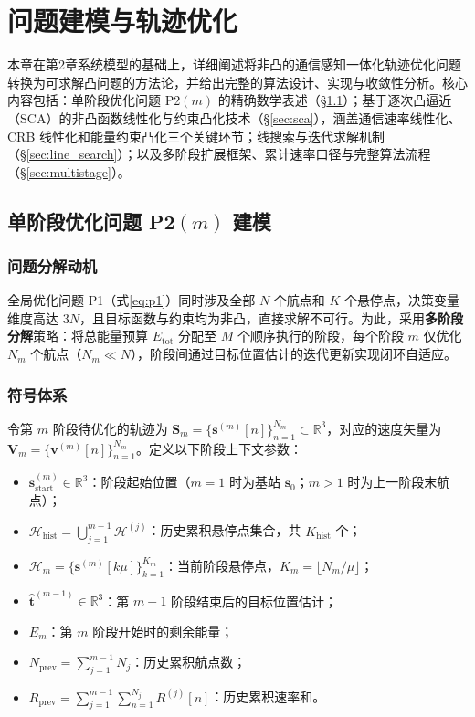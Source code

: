 \chapter{问题建模与轨迹优化}

本章在第2章系统模型的基础上，详细阐述将非凸的通信感知一体化轨迹优化问题转换为可求解凸问题的方法论，并给出完整的算法设计、实现与收敛性分析。核心内容包括：单阶段优化问题 P2$(m)$ 的精确数学表述（\S\ref{sec:p2m}）；基于逐次凸逼近（SCA）的非凸函数线性化与约束凸化技术（\S\ref{sec:sca}），涵盖通信速率线性化、CRB 线性化和能量约束凸化三个关键环节；线搜索与迭代求解机制（\S\ref{sec:line_search}）；以及多阶段扩展框架、累计速率口径与完整算法流程（\S\ref{sec:multistage}）。

\section{单阶段优化问题 P2$(m)$ 建模}
\label{sec:p2m}

\subsection{问题分解动机}

全局优化问题 P1（式\eqref{eq:p1}）同时涉及全部 $N$ 个航点和 $K$ 个悬停点，决策变量维度高达 $3N$，且目标函数与约束均为非凸，直接求解不可行。为此，采用\textbf{多阶段分解}策略：将总能量预算 $E_{\mathrm{tot}}$ 分配至 $M$ 个顺序执行的阶段，每个阶段 $m$ 仅优化 $N_m$ 个航点（$N_m\ll N$），阶段间通过目标位置估计的迭代更新实现闭环自适应。

\subsection{符号体系}

令第 $m$ 阶段待优化的轨迹为 $\mathbf{S}_m=\{\mathbf{s}^{(m)}[n]\}_{n=1}^{N_m}\subset\mathbb{R}^3$，对应的速度矢量为 $\mathbf{V}_m=\{\mathbf{v}^{(m)}[n]\}_{n=1}^{N_m}$。定义以下阶段上下文参数：

\begin{itemize}
    \item $\mathbf{s}_{\mathrm{start}}^{(m)}\in\mathbb{R}^3$：阶段起始位置（$m=1$ 时为基站 $\mathbf{s}_0$；$m>1$ 时为上一阶段末航点）；
    \item $\mathcal{H}_{\mathrm{hist}}=\bigcup_{j=1}^{m-1}\mathcal{H}^{(j)}$：历史累积悬停点集合，共 $K_{\mathrm{hist}}$ 个；
    \item $\mathcal{H}_m=\{\mathbf{s}^{(m)}[k\mu]\}_{k=1}^{K_m}$：当前阶段悬停点，$K_m=\lfloor N_m/\mu\rfloor$；
    \item $\hat{\mathbf{t}}^{(m-1)}\in\mathbb{R}^3$：第 $m-1$ 阶段结束后的目标位置估计；
    \item $E_m$：第 $m$ 阶段开始时的剩余能量；
    \item $N_{\mathrm{prev}}=\sum_{j=1}^{m-1}N_j$：历史累积航点数；
    \item $R_{\mathrm{prev}}=\sum_{j=1}^{m-1}\sum_{n=1}^{N_j}R^{(j)}[n]$：历史累积速率和。
\end{itemize}

